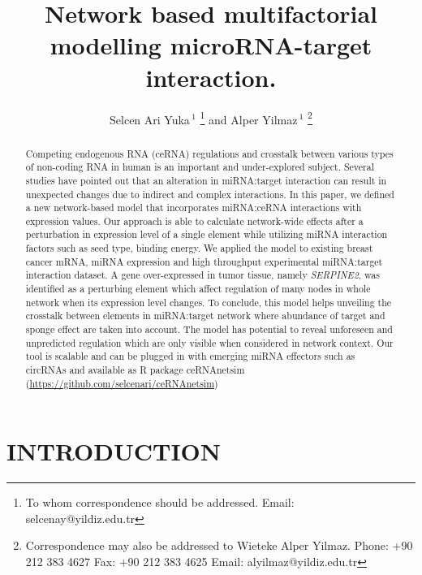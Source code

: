 \documentclass[a4,center,fleqn]{NAR}
\begin{document}
\title{Network based multifactorial modelling microRNA-target interaction.}

\author{
    Selcen Ari Yuka\,$^{1}$ \footnote{To whom correspondence should be addressed. Email: selcenay@yildiz.edu.tr}
   and Alper Yilmaz\,$^{1}$ \footnote{Correspondence may also be addressed to Wieteke Alper Yilmaz. Phone: +90 212 383 4627 Fax: +90 212 383 4625 Email: alyilmaz@yildiz.edu.tr}
}
        

\address{
   $^{1}$ Department of Bioengineering, Yildiz Technical University, Istanbul,
Turkey 
}



\maketitle

\begin{abstract}
Competing endogenous RNA (ceRNA) regulations and crosstalk between
various types of non-coding RNA in human is an important and
under-explored subject. Several studies have pointed out that an
alteration in miRNA:target interaction can result in unexpected changes
due to indirect and complex interactions. In this paper, we defined a
new network-based model that incorporates miRNA:ceRNA interactions with
expression values. Our approach is able to calculate network-wide
effects after a perturbation in expression level of a single element
while utilizing miRNA interaction factors such as seed type, binding
energy. We applied the model to existing breast cancer mRNA, miRNA
expression and high throughput experimental miRNA:target interaction
dataset. A gene over-expressed in tumor tissue, namely \emph{SERPINE2},
was identified as a perturbing element which affect regulation of many
nodes in whole network when its expression level changes. To conclude,
this model helps unveiling the crosstalk between elements in
miRNA:target network where abundance of target and sponge effect are
taken into account. The model has potential to reveal unforeseen and
unpredicted regulation which are only visible when considered in network
context. Our tool is scalable and can be plugged in with emerging miRNA
effectors such as circRNAs and available as R package ceRNAnetsim
(\url{https://github.com/selcenari/ceRNAnetsim})
\end{abstract}

\section{\texorpdfstring{\textbf{INTRODUCTION}}{}}
\end{document}
